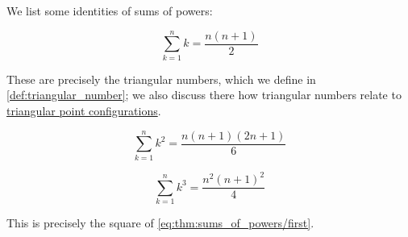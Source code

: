 \begin{proposition}\label{thm:sums_of_powers}
  We list some identities of sums of powers:
  \begin{thmenum}
    \begin{equation}\label{eq:thm:sums_of_powers/first}
      \sum_{k=1}^n k = \frac {n (n+1)} 2
    \end{equation}

    These are precisely the triangular numbers, which we define in \cref{def:triangular_number}; we also discuss there how triangular numbers relate to \hyperref[def:triangular_point_configuration]{triangular point configurations}.

    \begin{equation}\label{eq:thm:sums_of_powers/second}
      \sum_{k=1}^n k^2 = \frac {n (n+1) (2n + 1)} 6
    \end{equation}

    \begin{equation}\label{eq:thm:sums_of_powers/third}
      \sum_{k=1}^n k^3 = \frac {n^2 (n+1)^2} 4
    \end{equation}

    This is precisely the square of \eqref{eq:thm:sums_of_powers/first}.
  \end{thmenum}
\end{proposition}
